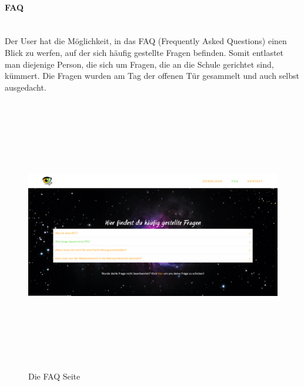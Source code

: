 \paragraph{FAQ} \leavevmode \\
Der User hat die Möglichkeit, in das FAQ (Frequently Asked Questions) einen Blick zu werfen, auf der sich häufig gestellte Fragen befinden. Somit entlastet man diejenige Person, die sich um Fragen, die an die Schule gerichtet sind, kümmert. Die Fragen wurden am Tag der offenen Tür gesammelt und auch selbst ausgedacht. 
\begin{figure}[h]
	\centering				\includegraphics[width=12cm,height=12cm,keepaspectratio]{webseite_faq} 
	\caption{Die FAQ Seite}
	\label{Abb7}
\end{figure} \leavevmode \newpage
